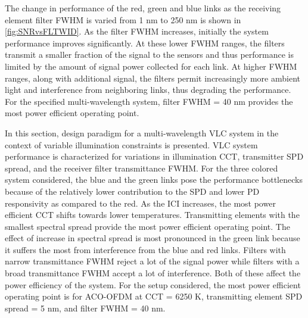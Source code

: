 The change in performance of the red, green and blue links as the receiving element filter FWHM is varied from 1 nm to 250 nm is shown in \figurename{ \ref{fig:SNRvsFLTWID}}. As the filter FWHM increases, initially the system performance improves significantly. At these lower FWHM ranges, the filters transmit a smaller fraction of the signal to the sensors and thus performance is limited by the amount of signal power collected for each link. At higher FWHM ranges, along with additional signal, the filters permit increasingly more ambient light and interference from neighboring links, thus degrading the performance. For the specified multi-wavelength system, filter FWHM = 40 nm provides the most power efficient operating point.

In this section, design paradigm for a multi-wavelength VLC system in the context of variable illumination constraints is presented. VLC system performance is characterized for variations in illumination CCT, transmitter SPD spread, and the receiver filter transmittance FWHM. For the three colored system considered, the blue and the green links pose the performance bottlenecks because of the relatively lower contribution to the SPD and lower PD responsivity as compared to the red. As the ICI increases, the most power efficient CCT shifts towards lower temperatures. Transmitting elements with the smallest spectral spread provide the most power efficient operating point. The effect of increase in spectral spread is most pronounced in the green link because it suffers the most from interference from the blue and red links. Filters with narrow transmittance FWHM reject a lot of the signal power while filters with a broad transmittance FWHM accept a lot of interference. Both of these affect the power efficiency of the system. For the setup considered, the most power efficient operating point is for ACO-OFDM at CCT = 6250 K, transmitting element SPD spread = 5 nm, and filter FWHM = 40 nm.






